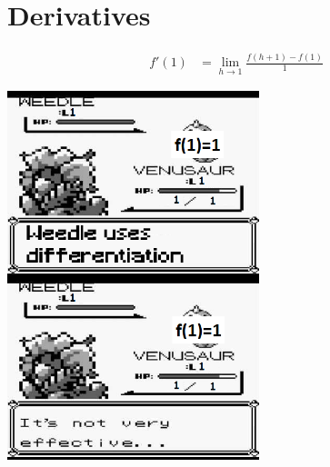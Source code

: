 \setcounter{section}{0}

\section{Derivatives}
\begin{align*}
  f'(1)&=\lim_{h\to 1}\frac{f(h+1)-f(1)}{1}
\end{align*}

\begin{center}
  \includegraphics[width=0.55\textwidth]{differentiation.png}\\
\end{center}
